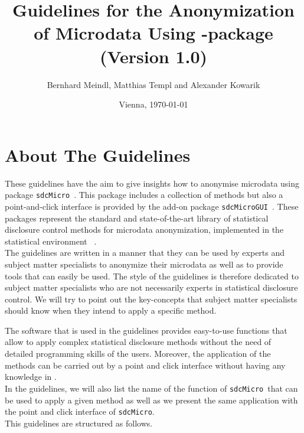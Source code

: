 \documentclass[12pt]{article}
\title{
	\vspace{1cm}
 	{\Large \textbf{Guidelines for the Anonymization of Microdata Using \R-package \sdcMicro} \\ (Version 1.0)}}
\author{Bernhard Meindl, Matthias Templ and Alexander Kowarik}
\date{Vienna, \today
	\vspace{13cm}
}
\newcommand{\sdcMicro}{\texttt{sdcMicro}}
\newcommand{\sdcMicroGUI}{\texttt{sdcMicroGUI}}
\begin{document}

\maketitle



\tableofcontents

\section{About The Guidelines} 
These guidelines have the aim to give insights how to anonymise microdata  
using package \sdcMicro \ 
\citep{sdcMicro,Templ08tdp}. This package includes a collection of 
methods but also a point-and-click interface is provided by the add-on package 
\sdcMicroGUI \ \citep{Templ09tdp,sdcMicroGUI}.
These packages represent 
the standard and state-of-the-art library of statistical disclosure 
control methods for microdata anonymization, implemented in the 
statistical environment \R \ \citep{RDev}.  \\

The guidelines are written in a manner that 
they can be used by experts and subject matter specialists    
to anonymize their microdata as well as to provide tools that can easily be used. 
The style of the guidelines is therefore dedicated to subject matter specialists
 who are not necessarily experts in statistical disclosure control. 
We will try to point out the key-concepts 
that subject matter specialists should know when they intend to apply a specific method. 


The software that is used in the guidelines 
provides easy-to-use functions that allow to apply complex statistical disclosure methods 
without the need of detailed programming skills of the users. Moreover, the application 
of the methods can be carried out by a 
 point and click interface \citep{Templ09tdp,sdcMicroGUI} without having any knowledge in \R. \\
In the guidelines, we will also list the name of the function of \sdcMicro~that can be used 
to apply a given method as well as we present the same application with 
the point and click interface of \sdcMicro. \\
 
 
 
 

This guidelines are structured as follows.         
\end{document}
